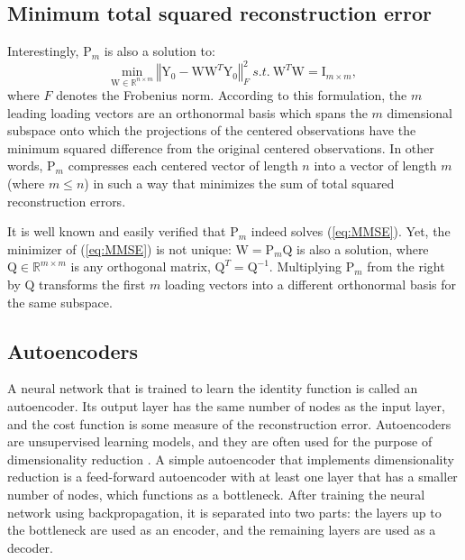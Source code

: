\documentclass[journal]{IEEEtran}
\begin{document}
\subsection{Minimum total squared reconstruction error}
Interestingly, $\text{P}_m$ is also a solution to:
\begin{equation}
\underset{\text{W} \in \mathbb{R}^{n \times m}}{\text{min}}{~\left\Vert \text{Y}_0-\text{W} \text{W}^T \text{Y}_0 \right\Vert_F^2}~s.t.~ \text{W}^T \text{W} = \text{I}_{m \times m},
\label{eq:MMSE}
\end{equation}
where $F$ denotes the Frobenius norm. According to this formulation, the $m$ leading loading vectors are an orthonormal basis which spans the $m$ dimensional subspace onto which the projections of the centered observations have the minimum squared difference from the original centered observations. In other words, $\text{P}_m$ compresses each centered vector of length $n$ into a vector of length $m$ (where $m \leq n$) in such a way that minimizes the sum of total squared reconstruction errors.

It is well known \cite{EckardtYoung} and easily verified that $\text{P}_m$ indeed solves (\ref{eq:MMSE}). Yet, the minimizer of (\ref{eq:MMSE}) is not unique: $\text{W} = \text{P}_m \text{Q}$ is also a solution, where $\text{Q} \in \mathbb{R}^{m \times m}$ is any orthogonal matrix, $\text{Q}^T = \text{Q}^{-1}$. Multiplying $\text{P}_m$ from the right by $\text{Q}$ transforms the first $m$ loading vectors into a different orthonormal basis for the same subspace.

\subsection{Autoencoders}
A neural network that is trained to learn the identity function is called an autoencoder. Its output layer has the same number of nodes as the input layer, and the cost function is some measure of the reconstruction error. Autoencoders are unsupervised learning models, and they are often used for the purpose of dimensionality reduction \cite{Dimreduction}. A simple autoencoder that implements dimensionality reduction is a feed-forward autoencoder with at least one layer that has a smaller number of nodes, which functions as a bottleneck. After training the neural network using backpropagation, it is separated into two parts: the layers up to the bottleneck are used as an encoder, and the remaining layers are used as a decoder.
\end{document}
